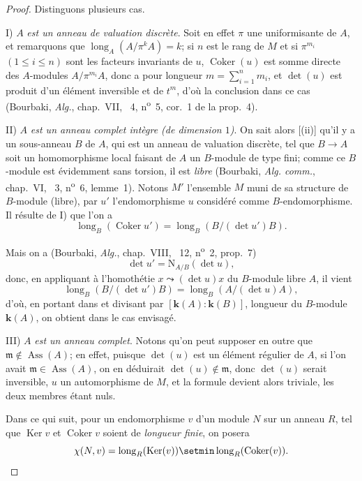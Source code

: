 \begin{proof}
Distinguons plusieurs cas.

I) $A$ \emph{est un anneau de valuation discrète}.
Soit en effet $\pi$ une uniformisante de $A$, et remarquons que $\operatorname{long}_A(A/\pi^kA)=k$;
si $n$ est le rang de $M$ et si $\pi^{m_i}$ $(1\leq i\leq n)$ sont les facteurs invariants de $u$, $\operatorname{Coker}(u)$ est somme directe des $A$-modules $A/\pi^{m_i}A$, donc a pour longueur $m=\sum_{i=1}^nm_i$, et $\det(u)$ est produit d'un élément inversible et de $t^m$, d'où la conclusion dans ce cas (Bourbaki, \emph{Alg.}, chap.~VII, \textsection~4, n\textsuperscript{o}~5, cor.~1 de la prop.~4).

II) $A$ \emph{est un anneau complet intègre (de dimension $1$)}.
On sait alors [(ii)] qu'il y a un sous-anneau $B$ de $A$, qui est un anneau de valuation discrète, tel que $B\to A$ soit un homomorphisme local faisant de $A$ un $B$-module de type fini;
comme ce $B$-module est évidemment sans torsion, il est \emph{libre} (Bourbaki, \emph{Alg. comm.}, chap.~VI, \textsection~3, n\textsuperscript{o}~6, lemme~1).
Notons $M'$ l'ensemble $M$ muni de sa structure de $B$-module (libre), par $u'$ l'endomorphisme $u$ considéré comme $B$-endomorphisme.
Il résulte de I) que l'on a
\[
\label{IV.21.10.17.5}
  \operatorname{long}_B(\operatorname{Coker}u')=\operatorname{long}_B(B/(\det u')B).
  \tag{21.10.17.5}
\]

Mais on a (Bourbaki, \emph{Alg.}, chap.~VIII, \textsection~12, n\textsuperscript{o}~2, prop.~7)
\[
  \det u'=\mathrm{N}_{A/B}(\det u),
\]
donc, en appliquant  à l'homothétie $x\leadsto(\det u)x$ du $B$-module libre $A$, il vient
\[
  \operatorname{long}_B(B/(\det u')B)=\operatorname{long}_B(A/(\det u)A),
\]
d'où, en portant dans  et divisant par $[\boldsymbol{k}(A):\boldsymbol{k}(B)]$, longueur du $B$-module $\boldsymbol{k}(A)$, on obtient  dans le cas envisagé.

III) $A$ \emph{est un anneau complet}.
Notons qu'on peut supposer en outre que $\mathfrak{m}\notin\operatorname{Ass}(A)$;
en effet, puisque $\det(u)$ est un élément régulier de $A$, si l'on avait $\mathfrak{m}\in\operatorname{Ass}(A)$, on en déduirait $\det(u)\notin\mathfrak{m}$, donc $\det(u)$ serait inversible, $u$ un automorphisme de $M$, et la formule  devient alors triviale, les deux membres étant nuls.

Dans ce qui suit, pour un endomorphisme $v$ d'un module $N$ sur un anneau $R$, tel que $\operatorname{Ker}v$ et $\operatorname{Coker}v$ soient de \emph{longueur finie}, on posera
\[
  \chi(N,v)=\operatorname{long}_R(\operatorname{Ker}(v))\setmin\operatorname{long}_R(\operatorname{Coker}(v)).
\]


\end{proof}
